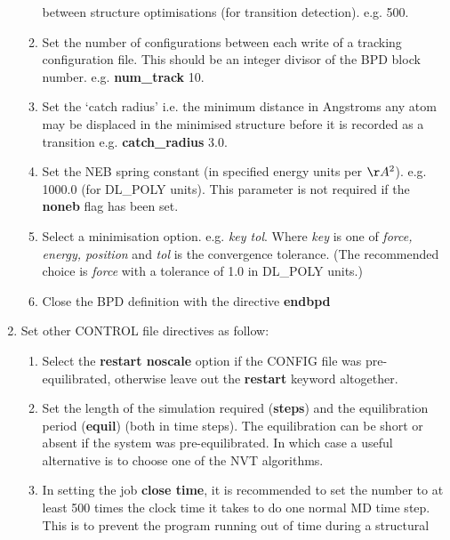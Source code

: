 \begin{enumerate}
\begin{enumerate}
      between structure optimisations (for transition
      detection). e.g.  500.
\item Set the number of configurations between each write of a tracking
      configuration file. This should be an integer divisor of the BPD
      block number. e.g. \newline
      {\bf num\_track} 10.
\item Set the `catch radius' i.e. the minimum distance 
      in Angstroms any atom may be displaced in the minimised structure 
      before it is recorded as a transition e.g. \newline 
      {\bf catch\_radius} 3.0.
\item Set the NEB spring constant (in specified energy units per $\AA^2$). 
       e.g.  1000.0 (for DL\_POLY units).
       This parameter is not required if the {\bf noneb} flag has been set.
\item Select a minimisation option.  e.g. 
       {\em key tol}.\newline 
      Where {\em key} is one of {\em force, energy, position} and {\em
      tol} is the convergence tolerance.
      (The recommended choice is {\em force} with a tolerance 
      of 1.0 in DL\_POLY units.)
\item Close the BPD definition with the directive \newline
      {\bf endbpd}
\end{enumerate}
\item Set other CONTROL file directives as follow:
\begin{enumerate}
\item Select the {\bf restart noscale} option if the CONFIG file was
      pre-equilibrated, otherwise leave out the {\bf restart} keyword 
      altogether.
\item Set the length of the simulation required ({\bf steps}) and the 
      equilibration period ({\bf equil}) (both in time steps). The
      equilibration can be short or absent if the system was pre-equilibrated.
      In which case a useful alternative is to choose one of the NVT
      algorithms. 
\item In setting the job {\bf close time}, it is
      recommended to set the number to at least 500 times the clock
      time it takes to do one normal MD time step. This is to prevent
      the program running out of time during a structural

\end{enumerate}
\end{enumerate}

